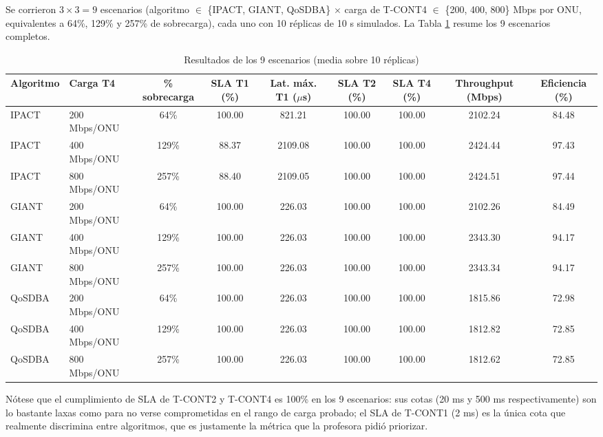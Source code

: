 \documentclass[conference]{IEEEtran}
\begin{document}
Se corrieron $3 \times 3 = 9$ escenarios (algoritmo $\in$
\{IPACT, GIANT, QoSDBA\} $\times$ carga de T-CONT4 $\in$
\{200, 400, 800\} Mbps por ONU, equivalentes a 64\%, 129\% y 257\% de
sobrecarga), cada uno con 10 réplicas de 10 s simulados. La Tabla
\ref{tab:resultados} resume los 9 escenarios completos.

\begin{table}[t]
\centering
\caption{Resultados de los 9 escenarios (media sobre 10 réplicas)}
\label{tab:resultados}
\begin{tabular}{llccccccc}
\toprule
Algoritmo & Carga T4 & \% sobrecarga & SLA T1 (\%) & Lat. máx. T1 ($\mu$s) & SLA T2 (\%) & SLA T4 (\%) & Throughput (Mbps) & Eficiencia (\%) \\
\midrule
IPACT  & 200 Mbps/ONU & 64\%  & 100.00 & 821.21  & 100.00 & 100.00 & 2102.24 & 84.48 \\
IPACT  & 400 Mbps/ONU & 129\% & 88.37  & 2109.08 & 100.00 & 100.00 & 2424.44 & 97.43 \\
IPACT  & 800 Mbps/ONU & 257\% & 88.40  & 2109.05 & 100.00 & 100.00 & 2424.51 & 97.44 \\
GIANT  & 200 Mbps/ONU & 64\%  & 100.00 & 226.03  & 100.00 & 100.00 & 2102.26 & 84.49 \\
GIANT  & 400 Mbps/ONU & 129\% & 100.00 & 226.03  & 100.00 & 100.00 & 2343.30 & 94.17 \\
GIANT  & 800 Mbps/ONU & 257\% & 100.00 & 226.03  & 100.00 & 100.00 & 2343.34 & 94.17 \\
QoSDBA & 200 Mbps/ONU & 64\%  & 100.00 & 226.03  & 100.00 & 100.00 & 1815.86 & 72.98 \\
QoSDBA & 400 Mbps/ONU & 129\% & 100.00 & 226.03  & 100.00 & 100.00 & 1812.82 & 72.85 \\
QoSDBA & 800 Mbps/ONU & 257\% & 100.00 & 226.03  & 100.00 & 100.00 & 1812.62 & 72.85 \\
\bottomrule
\end{tabular}
\end{table}

Nótese que el cumplimiento de SLA de T-CONT2 y T-CONT4 es 100\% en los 9
escenarios: sus cotas (20 ms y 500 ms respectivamente) son lo bastante
laxas como para no verse comprometidas en el rango de carga probado; el
SLA de T-CONT1 (2 ms) es la única cota que realmente discrimina entre
algoritmos, que es justamente la métrica que la profesora pidió priorizar.
\end{document}
